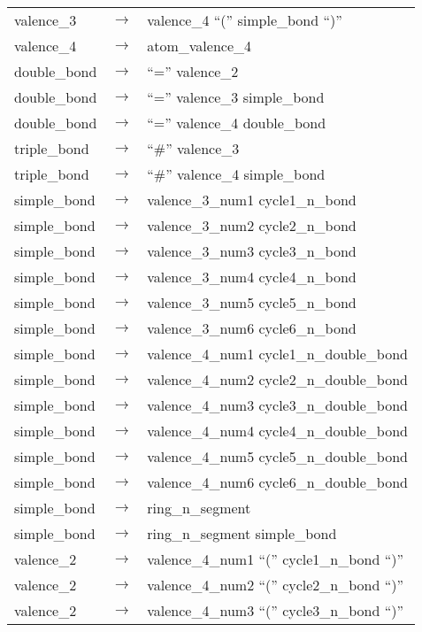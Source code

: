 \begin{longtable}{m{} p{} p{}}
    valence\_3 & $\rightarrow$ & valence\_4 ``('' simple\_bond ``)'' \\
    valence\_4 & $\rightarrow$ & atom\_valence\_4 \\
    double\_bond & $\rightarrow$ & ``='' valence\_2 \\
    double\_bond & $\rightarrow$ & ``='' valence\_3 simple\_bond \\
    double\_bond & $\rightarrow$ & ``='' valence\_4 double\_bond \\
    triple\_bond & $\rightarrow$ & ``\#'' valence\_3 \\
    triple\_bond & $\rightarrow$ & ``\#'' valence\_4 simple\_bond \\
    simple\_bond & $\rightarrow$ & valence\_3\_num1 cycle1\_n\_bond \\
    simple\_bond & $\rightarrow$ & valence\_3\_num2 cycle2\_n\_bond \\
    simple\_bond & $\rightarrow$ & valence\_3\_num3 cycle3\_n\_bond \\
    simple\_bond & $\rightarrow$ & valence\_3\_num4 cycle4\_n\_bond \\
    simple\_bond & $\rightarrow$ & valence\_3\_num5 cycle5\_n\_bond \\
    simple\_bond & $\rightarrow$ & valence\_3\_num6 cycle6\_n\_bond \\
    simple\_bond & $\rightarrow$ & valence\_4\_num1 cycle1\_n\_double\_bond \\
    simple\_bond & $\rightarrow$ & valence\_4\_num2 cycle2\_n\_double\_bond \\
    simple\_bond & $\rightarrow$ & valence\_4\_num3 cycle3\_n\_double\_bond \\
    simple\_bond & $\rightarrow$ & valence\_4\_num4 cycle4\_n\_double\_bond \\
    simple\_bond & $\rightarrow$ & valence\_4\_num5 cycle5\_n\_double\_bond \\
    simple\_bond & $\rightarrow$ & valence\_4\_num6 cycle6\_n\_double\_bond \\
    simple\_bond & $\rightarrow$ & ring\_n\_segment \\
    simple\_bond & $\rightarrow$ & ring\_n\_segment simple\_bond \\
    valence\_2 & $\rightarrow$ & valence\_4\_num1 ``('' cycle1\_n\_bond ``)'' \\
    valence\_2 & $\rightarrow$ & valence\_4\_num2 ``('' cycle2\_n\_bond ``)'' \\
    valence\_2 & $\rightarrow$ & valence\_4\_num3 ``('' cycle3\_n\_bond ``)'' \\

\end{longtable}
